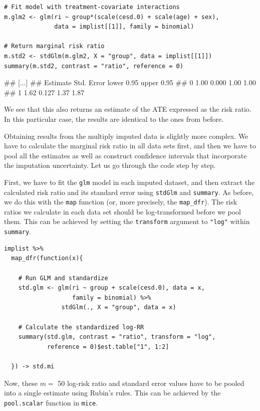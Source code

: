 \begin{lstlisting}
# Fit model with treatment-covariate interactions
m.glm2 <- glm(ri ~ group*(scale(cesd.0) + scale(age) + sex), 
              data = implist[[1]], family = binomial)

# Return marginal risk ratio
m.std2 <- stdGlm(m.glm2, X = "group", data = implist[[1]])
summary(m.std2, contrast = "ratio", reference = 0)  
\end{lstlisting}

\begin{example}
## [...]
##   Estimate Std. Error lower 0.95 upper 0.95
## 0     1.00      0.000       1.00       1.00
## 1     1.62      0.127       1.37       1.87
\end{example}

We see that this also returns an estimate of the ATE expressed as the risk ratio. In this particular case, the results are identical to the ones from before.

Obtaining results from the multiply imputed data is slightly more complex. We have to calculate the marginal risk ratio in all data sets first, and then we have to pool all the estimates as well as construct confidence intervals that incorporate the imputation uncertainty. Let us go through the code step by step.

First, we have to fit the \texttt{glm} model in each imputed dataset, and then extract the calculated risk ratio and its standard error using \texttt{stdGlm} and \texttt{summary}. As before, we do this with the \texttt{map} function (or, more precisely, the \texttt{map\_dfr}). The risk ratios we calculate in each data set should be log-transformed before we pool them. This can be achieved by setting the \texttt{transform} argument to \texttt{"log"} within \texttt{summary}.

\begin{lstlisting}
implist %>% 
  map_dfr(function(x){
    
    # Run GLM and standardize
    std.glm <- glm(ri ~ group + scale(cesd.0), data = x,
                   family = binomial) %>% 
                stdGlm(., X = "group", data = x)
    
    # Calculate the standardized log-RR
    summary(std.glm, contrast = "ratio", transform = "log",
            reference = 0)$est.table["1", 1:2] 
    
  }) -> std.mi
\end{lstlisting}

Now, these $m=$ 50 log-risk ratio and standard error values have to be pooled into a single estimate using Rubin's rules. This can be achieved by the \texttt{pool.scalar} function in \texttt{mice}.

